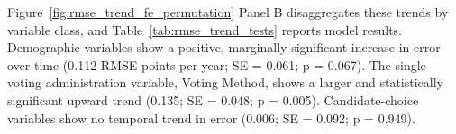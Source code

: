 \documentclass[12pt]{article}
\begin{document}
Figure~\ref{fig:rmse_trend_fe_permutation} Panel B  disaggregates these trends by variable class, and Table~\ref{tab:rmse_trend_tests} reports model results. Demographic variables show a positive, marginally significant increase in error over time (0.112 RMSE points per year; SE = 0.061; p = 0.067). The single voting administration variable, Voting Method, shows a larger and statistically significant upward trend (0.135; SE = 0.048; p = 0.005). Candidate-choice variables show no temporal trend in error (0.006; SE = 0.092; p = 0.949).






% 

\end{document}
